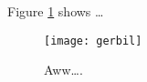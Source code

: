\documentclass{article}
\begin{document}
Figure \ref{fig:gerbil} shows \ldots

\begin{figure}
\centering
\texttt{[image: gerbil]}
\caption{\label{fig:gerbil}Aww\ldots.}
\end{figure}
\end{document}

